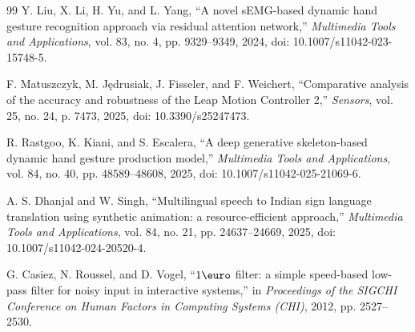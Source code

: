 \documentclass[10pt,twocolumn]{article}
\begin{document}
\begin{thebibliography}{99}
Y. Liu, X. Li, H. Yu, and L. Yang, ``A novel sEMG-based dynamic hand gesture recognition approach via residual attention network,'' \textit{Multimedia Tools and Applications}, vol. 83, no. 4, pp. 9329--9349, 2024, doi: 10.1007/s11042-023-15748-5.

F. Matuszczyk, M. J\k{e}drusiak, J. Fisseler, and F. Weichert, ``Comparative analysis of the accuracy and robustness of the Leap Motion Controller 2,'' \textit{Sensors}, vol. 25, no. 24, p. 7473, 2025, doi: 10.3390/s25247473.

R. Rastgoo, K. Kiani, and S. Escalera, ``A deep generative skeleton-based dynamic hand gesture production model,'' \textit{Multimedia Tools and Applications}, vol. 84, no. 40, pp. 48589--48608, 2025, doi: 10.1007/s11042-025-21069-6.

A. S. Dhanjal and W. Singh, ``Multilingual speech to Indian sign language translation using synthetic animation: a resource-efficient approach,'' \textit{Multimedia Tools and Applications}, vol. 84, no. 21, pp. 24637--24669, 2025, doi: 10.1007/s11042-024-20520-4.

G. Casiez, N. Roussel, and D. Vogel, ``$1\text{\euro}$ filter: a simple speed-based low-pass filter for noisy input in interactive systems,'' in \textit{Proceedings of the SIGCHI Conference on Human Factors in Computing Systems (CHI)}, 2012, pp. 2527--2530.

\end{thebibliography}
\end{document}

